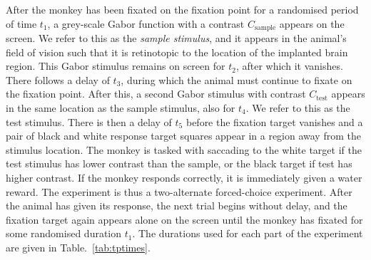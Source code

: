 After the monkey has been fixated on the fixation point for a randomised period of time
$t_1$,
a grey-scale Gabor function with a contrast $C_\text{sample}$ appears on the screen.
We refer to this as the \textit{sample stimulus}, and it appears in the animal's field of vision such that it is retinotopic to the location of the implanted brain region.
This Gabor stimulus remains on screen for $t_2$, after which it vanishes.
There follows a delay of $t_3$, during which the animal must continue to fixate on the fixation point.
After this, a second Gabor stimulus with contrast $C_\text{test}$ appears in the same location as the sample stimulus, also for $t_4$.
We refer to this as the test stimulus.
There is then a delay of $t_5$ before the fixation target vanishes and a pair of black and white response target squares appear in a region away from the stimulus location.
The monkey is tasked with saccading to the white target if the test stimulus has lower contrast than the sample, or the black target if test has higher contrast.
If the monkey responds correctly, it is immediately given a water reward.
The experiment is thus a two-alternate forced-choice experiment.
After the animal has given its response, the next trial begins without delay, and the fixation target again appears alone on the screen until the monkey has fixated for some randomised duration $t_1$.
The durations used for each part of the experiment are given in Table.~\ref{tab:tptimes}.

